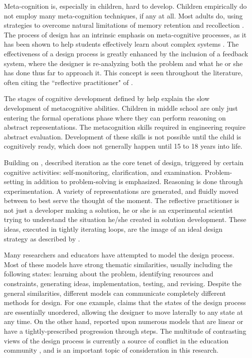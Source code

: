 Meta-cognition is, especially in children, hard to develop. Children empirically do not employ many meta-cognition techniques, if any at all. Most adults do, using strategies to overcome natural limitations of memory retention and recollection \citep{brown-1992}. The process of design has an intrinsic emphasis on meta-cognitive processes, as it has been shown to help students effectively learn about complex systems \citep{designing-to-learn}. The effectiveness of a design process is greatly enhanced by the inclusion of a feedback system, where the designer is re-analyzing both the problem and what he or she has done thus far to approach it. This concept is seen throughout the literature, often citing the ``reflective practitioner" of \citet{schon83}. 

The stages of cognitive development defined by \citet{piaget69} help explain the slow development of metacognitive abilities. Children in middle school are only just entering the formal operations phase where they can perform reasoning on abstract representations. The metacognition skills required in engineering require abstract evaluation. Development of these skills is not possible until the child is cognitively ready, which does not generally happen until 15 to 18 years into life. 

Building on \citet{schon83}, \citet{atman-2003} described iteration as the core tenet of design, triggered by certain cognitive activities: self-monitoring, clarification, and examination. Problem-setting in addition to problem-solving
is emphasized. Reasoning is done through experimentation. A variety
of representations are generated, and fluidly moved between to best
serve the thought of the moment. The reflective practitioner is not
just a developer making a solution, he or she is an experimental scientist
trying to understand the situation he/she created in solution development.
These ideas, executed in tightly iterating loops, are the image of an ideal design strategy as described by \citeauthor{schon83}.

Many researchers and educators have attempted to model the design process. Most of these models have strong thematic similarities, usually including the following states: learning about the problem, identifying resources and constraints, generating ideas, implementation, testing, and revising. Despite the general similarities, different models can communicate completely different methods for design. For one example, \citet{welch} claims that the states of the design process are essentially unordered, allowing the designer to move laterally to any state at any time. On the other hand, \citet{kimbell06} reported upon numerous models that are linear or have a tightly-prescribed progression through steps. The multitude of contrasting views of the design process is currently a source of conflict in the education community \citep{REESE}, and is an important topic of consideration in this research.


